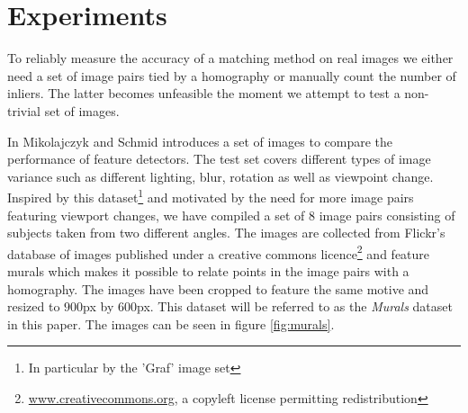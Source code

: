 \documentclass[conference]{IEEEtran}
\begin{document}
%

\section{Experiments}
\label{experiment}
%
To reliably measure the accuracy of a matching method on real images we 
either need a set of image pairs tied by a homography or manually count 
the number of inliers. The latter becomes unfeasible the moment we 
attempt to test a non-trivial set of images. 

In \cite{mikolajczyk2005performance} Mikolajczyk and Schmid introduces a 
set of images to compare the performance of feature detectors. The test 
set covers different types of image variance such as different lighting, 
blur, rotation as well as viewpoint change. Inspired by this 
dataset\footnote{In particular by the 'Graf' image set} and motivated by 
the need for more image pairs featuring viewport changes, we have 
compiled a set of $8$ image pairs consisting of subjects taken from two 
different angles. The images are collected from Flickr's database of 
images published under a creative commons 
licence\footnote{\href{http://creativecommons.org/}{www.creativecommons.org}, 
a copyleft license permitting redistribution} and feature murals which 
makes it possible to relate points in the image pairs with a homography.  
The images have been cropped to feature the same motive and resized to 
$900$px by $600$px. This dataset will be referred to as the 
\emph{Murals} dataset in this paper. The images can be seen in figure 
\ref{fig:murals}.
\end{document}

